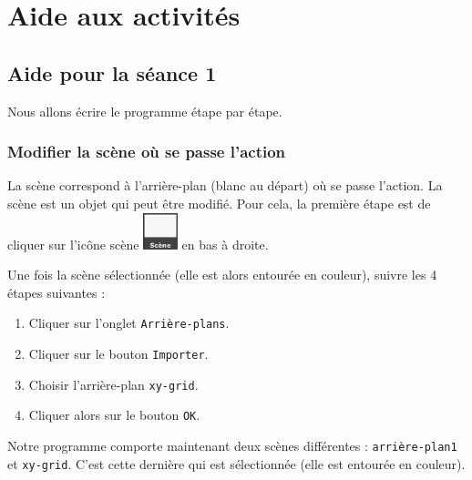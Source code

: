 





%
%
%
%



\section{Aide aux activités}

\subsection{Aide pour la séance 1}\label{correction_scratch1}




Nous allons écrire le programme étape par étape.


\subsubsection{Modifier la scène où se passe l'action}

La scène correspond à l'arrière-plan (blanc au départ) où se passe l'action. La scène est un objet qui peut être modifié. Pour cela, la première étape est de cliquer sur l'icône scène \includegraphics[width=1cm]{./images/scratch/Scene} en bas à droite.


Une fois la scène sélectionnée (elle est alors entourée en couleur), suivre les 4 étapes suivantes :

\begin{enumerate}
\item Cliquer sur l'onglet \texttt{Arrière-plans}.
\item Cliquer sur le bouton \texttt{Importer}.
\item Choisir l'arrière-plan \texttt{xy-grid}.
\item Cliquer alors sur le bouton \texttt{OK}. 
\end{enumerate}



Notre programme comporte maintenant deux scènes différentes : \texttt{arrière-plan1} et \texttt{xy-grid}. C'est cette dernière qui est sélectionnée (elle est entourée en couleur).

